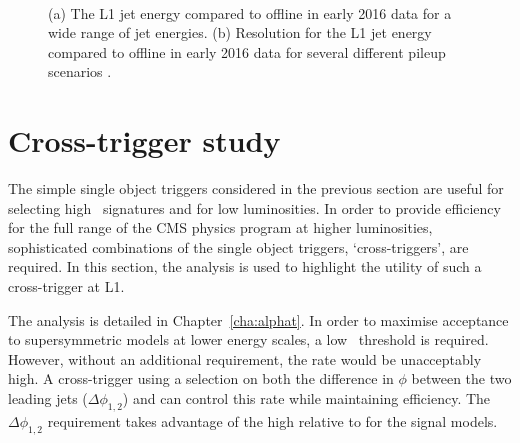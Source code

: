\begin{figure}
\centering
	~
	\caption{(a) The L1 jet energy compared to offline in early 2016 data for a wide
range of jet energies. (b) Resolution for the L1 jet energy compared to offline in early 2016 data for several different 
pileup scenarios \cite{l1sums_perf}.}
\label{fig:trig_2016}
\end{figure}


\section{Cross-trigger study}
\label{sec:cross_trigger}
The simple single object triggers considered in the previous section are useful for selecting
high \pt~signatures and for low luminosities. In order to provide efficiency for
the full range of the CMS physics program at higher luminosities, sophisticated combinations
of the single object triggers, `cross-triggers', are required. In this section, the \alphat 
analysis is used to highlight the utility of such a cross-trigger at L1. 

The \alphat analysis is detailed in Chapter~\ref{cha:alphat}. In order to maximise acceptance
to supersymmetric models at lower energy scales, a low \scalht~threshold is required. 
However, without an additional requirement, the rate
would be unacceptably high. A cross-trigger using a selection on both the difference 
in $\phi$ between the two leading jets ($\Delta\phi_{1,2}$) and \scalht can control this rate while 
maintaining efficiency. The $\Delta\phi_{1,2}$ requirement takes advantage of the high relative 
\mht to \scalht for the signal models.

